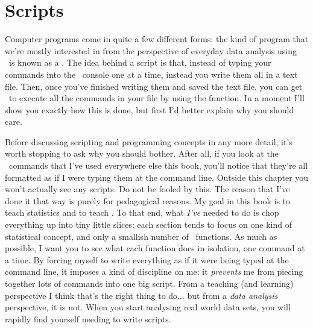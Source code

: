 \section{Scripts\label{sec:scripts}}


Computer programs come in quite a few different forms: the kind of program that we're mostly interested in from the perspective of everyday data analysis using \R\ is known as a . The idea behind a script is that, instead of typing your commands into the \R\ console one at a time, instead you write them all in a text file. Then, once you've finished writing them and saved the text file, you can get \R\ to execute all the commands in your file by using the  function. In a moment I'll show you exactly how this is done, but first I'd better explain why you should care.



Before discussing scripting and programming concepts in any more detail, it's worth stopping to ask why you should bother. After all, if you look at the \R\ commands that I've used everywhere else this book, you'll notice that they're all formatted as if I were typing them at the command line. Outside this chapter you won't actually see any scripts. Do not be fooled by this. The reason that I've done it that way is purely for pedagogical reasons. My goal in this book is to teach statistics and to teach \R. To that end, what {\it I've} needed to do is chop everything up into tiny little slices: each section tends to focus on one kind of statistical concept, and only a smallish number of \R\ functions. As much as possible, I want you to see what each function does in isolation, one command at a time. By forcing myself to write everything as if it were being typed at the command line, it imposes a kind of discipline on me: it {\it prevents} me from piecing together lots of commands into one big script. From a teaching (and learning) perspective I think that's the right thing to do... but from a {\it data analysis} perspective, it is not. When you start analysing real world data sets, you will rapidly find yourself needing to write scripts.


